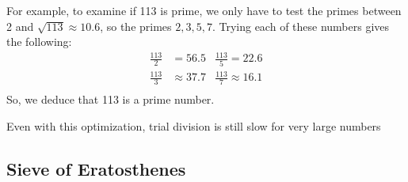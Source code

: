 \documentclass[12pt, titlepage]{article}
\begin{document}
For example, to examine if 113 is prime, we only have to test the primes between
2 and $\sqrt{113} \approx 10.6$, so the primes $2, 3,  5, 7$. Trying each of these numbers
gives the following:
%
\begin{align*}
    \frac{113}{2} &= 56.5 &\frac{113}{5} = 22.6 \\
    \frac{113}{3} &\approx 37.7 &\frac{113}{7} \approx 16.1\\
\end{align*}
%
So, we deduce that 113 is a prime number.

Even with this optimization, trial division is still slow for very large numbers 

\subsection{Sieve of Eratosthenes}
\end{document}
